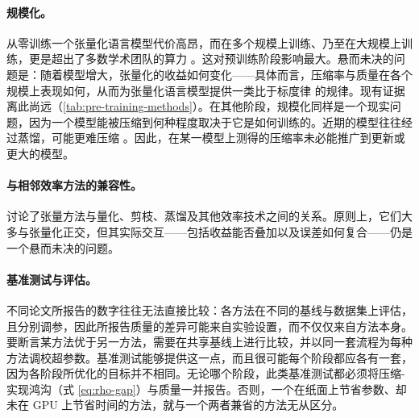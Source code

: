 \documentclass[11pt]{article}
\newcommand{\R}{\mathbb{R}}
\newcommand{\ten}[1]{\mathcal{#1}}
\begin{document}
\paragraph{规模化。} 

从零训练一个张量化语言模型代价高昂，而在多个规模上训练、乃至在大规模上训练，更是超出了多数学术团队的算力 \cite{chekalina2023ttm}。这对预训练阶段影响最大。悬而未决的问题是：随着模型增大，张量化的收益如何变化——具体而言，压缩率与质量在各个规模上表现如何，从而为张量化语言模型提供一类比于标度律 \cite{kaplan2020scalinglaws} 的规律。现有证据离此尚远（\cref{tab:pre-training-methods}）。在其他阶段，规模化同样是一个现实问题，因为一个模型能被压缩到何种程度取决于它是如何训练的。近期的模型往往经过蒸馏，可能更难压缩 \cite{solgi2025saten}。因此，在某一模型上测得的压缩率未必能推广到更新或更大的模型。

\paragraph{与相邻效率方法的兼容性。} 

 讨论了张量方法与量化、剪枝、蒸馏及其他效率技术之间的关系。原则上，它们大多与张量化正交，但其实际交互——包括收益能否叠加以及误差如何复合——仍是一个悬而未决的问题。


\paragraph{基准测试与评估。}

不同论文所报告的数字往往无法直接比较：各方法在不同的基线与数据集上评估，且分别调参，因此所报告质量的差异可能来自实验设置，而不仅仅来自方法本身。要断言某方法优于另一方法，需要在共享基线上进行比较，并以同一套流程为每种方法调校超参数。基准测试能够提供这一点，而且很可能每个阶段都应各有一套，因为各阶段所优化的目标并不相同。无论哪个阶段，此类基准测试都必须将压缩-实现鸿沟（式 \ref{eq:rho-gap}）与质量一并报告。否则，一个在纸面上节省参数、却未在 GPU 上节省时间的方法，就与一个两者兼省的方法无从区分。

\end{document}
